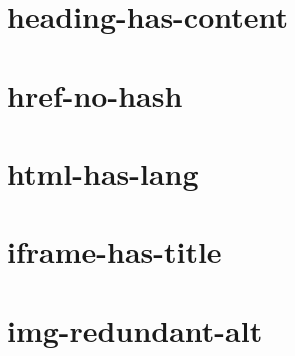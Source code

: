\documentclass[twoside]{book}
\newcommand{\+}{\discretionary{\mbox{\scriptsize$\hookleftarrow$}}{}{}}
\begin{document}
\chapter{heading-\/has-\/content}
\label{md__c_1_workspace_demo_src_main_script_node_modules_eslint-plugin-jsx-a11y_docs_rules_heading-has-content}

\chapter{href-\/no-\/hash}
\label{md__c_1_workspace_demo_src_main_script_node_modules_eslint-plugin-jsx-a11y_docs_rules_href-no-hash}

\chapter{html-\/has-\/lang}
\label{md__c_1_workspace_demo_src_main_script_node_modules_eslint-plugin-jsx-a11y_docs_rules_html-has-lang}

\chapter{iframe-\/has-\/title}
\label{md__c_1_workspace_demo_src_main_script_node_modules_eslint-plugin-jsx-a11y_docs_rules_iframe-has-title}

\chapter{img-\/redundant-\/alt}
\label{md__c_1_workspace_demo_src_main_script_node_modules_eslint-plugin-jsx-a11y_docs_rules_img-redundant-alt}

\end{document}
